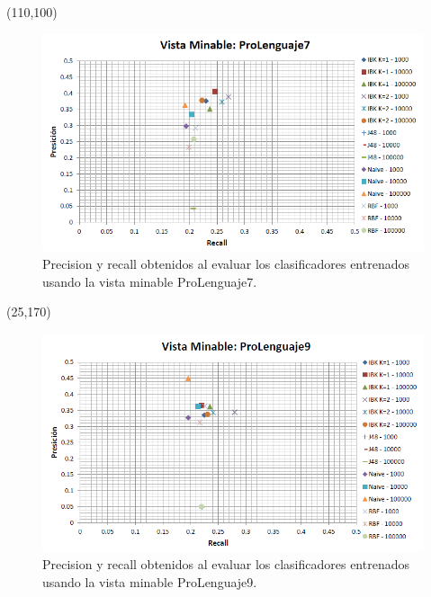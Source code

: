 \documentclass{article}
\begin{document}
\begin{textblock}{80}(110,100)
\begin{figure}[!htb]
\begin{centering}
\includegraphics[scale=0.4]{prolenguaje7}
\par\end{centering}
\caption{Precision y recall obtenidos al evaluar los clasificadores entrenados usando la vista minable ProLenguaje7.}
\label{fig:figura14}
\end{figure}
\end{textblock}

\begin{textblock}{80}(25,170)
\begin{figure}[!htb]
\begin{centering}
\includegraphics[scale=0.4]{prolenguaje9}
\par\end{centering}
\caption{Precision y recall obtenidos al evaluar los clasificadores entrenados usando la vista minable ProLenguaje9.}
\label{fig:figura15}
\end{figure}
\end{textblock}
\end{document}
